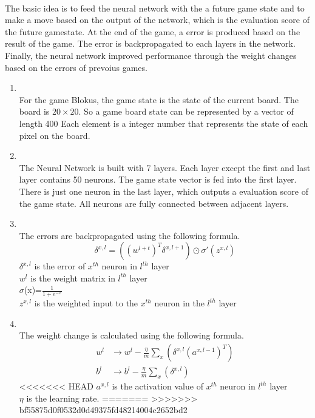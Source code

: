 \documentclass{report}
\begin{document}
	\\
	The basic idea is to feed the neural network with the a future game state and to make a move based on the output of the network, which is the evaluation score of the future gamestate.
	At the end of the game, a error is produced based on the result of the game. The error is backpropagated to each layers in the network. Finally, the neural network improved performance through
	the weight changes based on the errors of prevoius games.
	\begin{enumerate}
		\item {}\\
			For the game Blokus, the game state is the state of the current board. The board is $20\times20$. So a game board state can be represented by a vector of length 400
			Each element is a integer number that represents the state of each pixel on the board. 
		\item {}\\
			The Neural Network is built with 7 layers. Each layer except the first and last layer contains 50 neurons. The game state vector is fed into the first layer. There is just one
			neuron in the last layer, which outputs a evaluation score of the game state. All neurons are fully connected between adjacent layers. 
		\item {}\\
			The errors are backpropagated using the following formula.
				\begin{equation*}
				\delta^{x, l} = \left( \left( w^{l+t} \right)^T \delta^{x, l+1} \right) \odot  \sigma'\left( z^{x, l}\right)
				\end{equation*}
			$\delta^{x, l}$  is the error of $x^{th}$ neuron in $l^{th}$ layer\\
			$w^l$  is the weight matrix in $l^{th}$ layer \\
			$\sigma$(x)=$\frac{1}{1+e^{-x}}$ \\
			$z^{x, l}$ is the weighted input to the $x^{th}$ neuron in the $l^{th}$ layer
		\item {}\\
			The weight change is calculated using the following formula.
				\begin{align*}
					w^l &\rightarrow w^l - \frac{\eta}{m} \sum_{x} \left(\delta^{x, l} \left( a^{x, l-1}\right) ^T\right) \\
					b^l &\rightarrow b^l - \frac{\eta}{m} \sum_{x} \left(\delta^{x, l}\right)
				\end{align*}
<<<<<<< HEAD
					$a^{x, l}$  is the activation value of $x^{th}$ neuron in $l^{th}$ layer \\
					$\eta$ is the learning rate.
=======
>>>>>>> bf55875d0f0532d0d49375fd48214004c2652bd2
	\end{enumerate}
\end{document}
